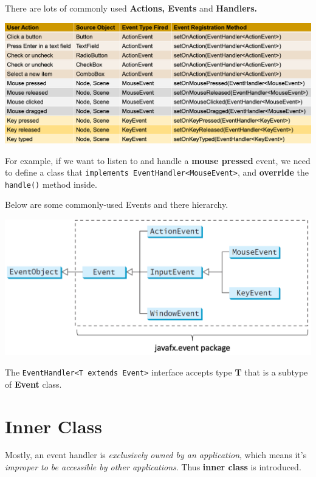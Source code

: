 \documentclass[11pt, a4paper]{COMP3021}
\newcommand{\motiv}{\blue {\bf Motivation: }}
\begin{document}
\begin{spacing}{1.2}
    \vspace{0.5in}
    There are lots of commonly used {\bf Actions, Events} and {\bf Handlers.}
    \begin{center}
        \includegraphics[scale=0.39]{images/08-events.png}
    \end{center}
    For example, if we want to listen to and handle a {\bf mouse pressed} event,
    we need to define a class that 
    \texttt{implements EventHandler<MouseEvent>}, and {\bf override}
    the \texttt{handle()} method inside.

    \vspace{0.5in}
    Below are some commonly-used Events and there hierarchy.
    \begin{center}
        \includegraphics[scale=0.4]{images/08-events-tree.png}
    \end{center}

    The \texttt{EventHandler<T extends Event>} interface accepts 
    type {\bf T} that is a subtype of {\bf Event} class.


    \newpage
    \section{Inner Class}
    {\motiv 
        Mostly, an event handler is {\it exclusively owned by an application},
        which means it's {\it improper to be accessible by other applications}.
        Thus {\bf inner class} is introduced.
    }


\end{spacing}
\end{document}
